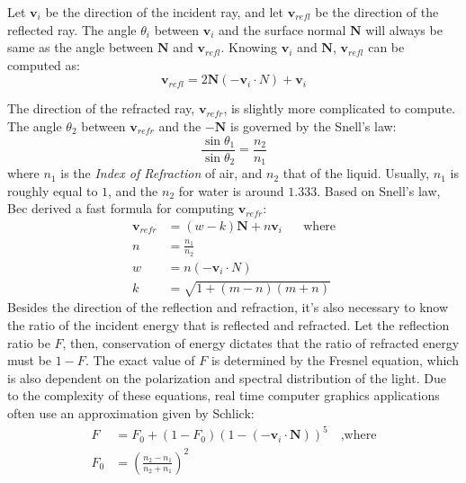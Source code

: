 Let $\textbf{v}_i$ be the direction of the incident ray, and let $\textbf{v}_{refl}$ be the direction of the reflected ray. The angle $\theta_i$ between $\textbf{v}_i$ and the surface normal $\textbf{N}$ will always be same as the angle between $\textbf{N}$ and $\textbf{v}_{refl}$. Knowing $\textbf{v}_i$ and $\textbf{N}$, $\textbf{v}_{refl}$ can be computed as:
\begin{equation}
    \label{eqn direction of reflection}
    \textbf{v}_{refl} = 2\textbf{N}(-\textbf{v}_i \cdot N) + \textbf{v}_i
\end{equation}

The direction of the refracted ray, $\textbf{v}_{refr}$, is slightly more complicated to compute. The angle $\theta_2$ between $\textbf{v}_{refr}$ and the $-\textbf{N}$ is governed by the Snell's law:
$$
\frac{\sin\theta_1}{\sin\theta_2}=\frac{n_2}{n_1}
$$
where $n_1$ is the \textit{Index of Refraction} of air, and $n_2$ that of the liquid. Usually, $n_1$ is roughly equal to $1$, and the $n_2$ for water is around $1.333$. Based on Snell's law, Bec\cite{bec1997faster} derived a fast formula for computing $\textbf{v}_{refr}$:
\begin{equation}
    \label{eqn direction of refraction}
    \begin{aligned}
        \textbf{v}_{refr} &= (w-k)\textbf{N} + n\textbf{v}_{i}\mbox{~~~~ where}\\
        n &= \frac{n_1}{n_2}\\
        w &= n(-\textbf{v}_i \cdot N) \\
        k &= \sqrt{1+(m-n)(m+n)} 
    \end{aligned}
\end{equation}
Besides the direction of the reflection and refraction, it's also necessary to know the ratio of the incident energy that is reflected and refracted. Let the reflection ratio be $F$, then, conservation of energy dictates that the ratio of refracted energy must be $1-F$. The exact value of $F$ is determined by the Fresnel equation, which is also dependent on the polarization and spectral distribution of the light. Due to the complexity of these equations, real time computer graphics applications often use an approximation given by Schlick\cite{schlick1994inexpensive}:
\begin{equation}
    \label{eqn Schlick}
    \begin{aligned}
        F &= F_0 + (1-F_0)(1-(-\textbf{v}_i \cdot \textbf{N}))^5\mbox{~~~,where}\\
        F_0 &= \left(\frac{n_2-n_1}{n_2+n_1}\right)^2
    \end{aligned}
\end{equation}


